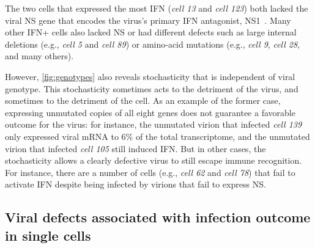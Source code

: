 \documentclass[10pt,letterpaper]{article}
\newcommand{\FIG}[1]{\autoref{fig:#1}}
\begin{document}
The two cells that expressed the most IFN (\textit{cell 13} and \textit{cell 123}) both lacked the viral NS gene that encodes the virus's primary IFN antagonist, NS1~\citep{garcia1998influenza, hale2008multifunctional}.
Many other IFN+ cells also lacked NS or had different defects such as large internal deletions (e.g., \textit{cell 5} and \textit{cell 89}) or amino-acid mutations (e.g., \textit{cell 9}, \textit{cell 28}, and many others).

However, \FIG{genotypes} also reveals stochasticity that is independent of viral genotype.
This stochasticity sometimes acts to the detriment of the virus, and sometimes to the detriment of the cell.
As an example of the former case, expressing unmutated copies of all eight genes does not guarantee a favorable outcome for the virus: for instance, the unmutated virion that infected \textit{cell 139} only expressed viral mRNA to 6\% of the total transcriptome, and the unmutated virion that infected \textit{cell 105} still induced IFN.
But in other cases, the stochasticity allows a clearly defective virus to still escape immune recognition.
For instance, there are a number of cells (e.g., \textit{cell 62} and \textit{cell 78}) that fail to activate IFN despite being infected by virions that fail to express NS.

\subsection*{Viral defects associated with infection outcome in single cells}
\end{document}
